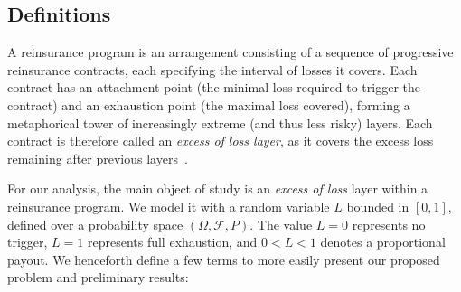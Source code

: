 \documentclass{amsart}
\theoremstyle{plain}
\theoremstyle{definition}
\theoremstyle{definition}
\theoremstyle{remark}
\begin{document}
\subsection{Definitions}
A reinsurance program is an arrangement consisting of a sequence of progressive reinsurance contracts, each specifying the interval of losses it covers. Each contract has an attachment point (the minimal loss required to trigger the contract) and an exhaustion point (the maximal loss covered), forming a metaphorical tower of increasingly extreme (and thus less risky) layers. Each contract is therefore called an \textit{excess of loss layer}, as it covers the excess loss remaining after previous
layers~\cite{W:gibson-2026}.

For our analysis, the main object of study is an \textit{excess of loss} layer within a reinsurance program. We model it with a random variable \(L\) bounded in \(\left[0,1\right]\), defined over a probability space \(\left(\Omega, \mathcal{F}, P\right)\). The value \(L = 0\) represents no trigger, \(L = 1\) represents full exhaustion, and \(0 < L < 1\) denotes a proportional payout. We henceforth define a few terms to more easily present our proposed problem and preliminary results:
\end{document}
